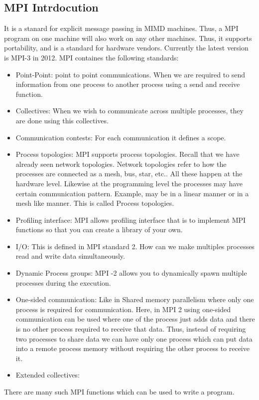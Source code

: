 \documentclass[12pt]{book}
\begin{document}
\subsection{MPI Intrdocution}
It is a stanard for explicit message passing in MIMD machines. Thus, a MPI program on one machine will also work on any other machines. Thus, it supports portability, and is a standard for hardware vendors. Currently the latest version is MPI-3 in 2012.
MPI containes the following standards:
\begin{itemize}
    \item Point-Point: point to point communications. When we are required to send information from one process to another process using a send and receive function.
    \item Collectives: When we wish to communicate across multiple processes, they are done using this collectives.
    \item Communication contests: For each communication it defines a scope.
    \item Process topologies: MPI supports process topologies. Recall that we have already seen network topologies. Network topologies refer to how the processes are connected as a mesh, bus, star, etc..
    All these happen at the hardware level. Likewise at the programming level the processes may have certain communication pattern. Example, may be in a linear manner or in a mesh like manner. This is called Process topologies.
    \item Profiling interface: MPI allows profiling interface that is to implement MPI functions so that you can create a library of your own.
    \item I/O: This is defined in MPI standard 2. How can we make multiples processes read and write data simultaneously.
    \item Dynamic Process groups: MPI -2 allows you to dynamically spawn multiple processes during the execution.
    \item One-sided communication: Like in Shared memory parallelism where only one process is required for communication. Here, in MPI 2 using one-sided communication can be used where one of the process just adds data and there is no other process required to receive that data. Thus, instead of requiring two processes to share data we can have only one process which can put data into a remote process memory without requiring the other process to receive it.
    \item Extended collectives:
\end{itemize}
There are many such MPI functions which can be used to write a program. 
\end{document}
